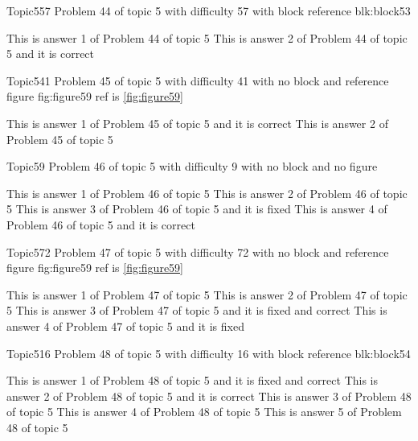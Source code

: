 \documentclass[master]{exam}
\begin{document}
\begin{problem}[requires=blk:block53]{Topic5}{57}
	Problem 44 of topic 5 with difficulty 57 with block reference blk:block53
	\begin{answers}
		\answer This is answer 1 of Problem 44 of topic 5 
		\answer[correct] This is answer 2 of Problem 44 of topic 5 and it is correct
	\end{answers}
\end{problem}

\begin{problem}{Topic5}{41}
	Problem 45 of topic 5 with difficulty 41 with no block and reference figure fig:figure59 ref is \ref{fig:figure59}
	\begin{answers}
		\answer[correct] This is answer 1 of Problem 45 of topic 5 and it is correct
		\answer This is answer 2 of Problem 45 of topic 5 
	\end{answers}
\end{problem}

\begin{problem}{Topic5}{9}
	Problem 46 of topic 5 with difficulty 9 with no block and no figure
	\begin{answers}
		\answer This is answer 1 of Problem 46 of topic 5 
		\answer This is answer 2 of Problem 46 of topic 5 
		\answer[fixed] This is answer 3 of Problem 46 of topic 5 and it is fixed
		\answer[correct] This is answer 4 of Problem 46 of topic 5 and it is correct
	\end{answers}
\end{problem}

\begin{problem}{Topic5}{72}
	Problem 47 of topic 5 with difficulty 72 with no block and reference figure fig:figure59 ref is \ref{fig:figure59}
	\begin{answers}
		\answer This is answer 1 of Problem 47 of topic 5 
		\answer This is answer 2 of Problem 47 of topic 5 
		 This is answer 3 of Problem 47 of topic 5 and it is fixed and correct
		\answer[fixed] This is answer 4 of Problem 47 of topic 5 and it is fixed
	\end{answers}
\end{problem}

\begin{problem}[requires=blk:block54]{Topic5}{16}
	Problem 48 of topic 5 with difficulty 16 with block reference blk:block54
	\begin{answers}
		 This is answer 1 of Problem 48 of topic 5 and it is fixed and correct
		\answer[correct] This is answer 2 of Problem 48 of topic 5 and it is correct
		\answer This is answer 3 of Problem 48 of topic 5 
		\answer This is answer 4 of Problem 48 of topic 5 
		\answer This is answer 5 of Problem 48 of topic 5 
	\end{answers}
\end{problem}
\end{document}
